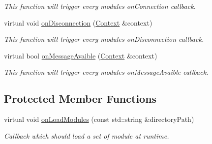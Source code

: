 \begin{DoxyCompactItemize}
\begin{DoxyCompactList}\small\item\em This function will trigger every module\textquotesingle{}s \textquotesingle{}on\+Connection\textquotesingle{} callback. \end{DoxyCompactList}\item 
virtual void \mbox{\hyperlink{classo_z_1_1_pipeline_a4245ad0f1fb310cf19986dbaf0bff3d2}{on\+Disconnection}} (\mbox{\hyperlink{classo_z_1_1_context}{Context}} \&context)
\begin{DoxyCompactList}\small\item\em This function will trigger every module\textquotesingle{}s \textquotesingle{}on\+Disconnection\textquotesingle{} callback. \end{DoxyCompactList}\item 
virtual bool \mbox{\hyperlink{classo_z_1_1_pipeline_a5dc5181a699312bc35384ad706668e3c}{on\+Message\+Avaible}} (\mbox{\hyperlink{classo_z_1_1_context}{Context}} \&context)
\begin{DoxyCompactList}\small\item\em This function will trigger every module\textquotesingle{}s \textquotesingle{}on\+Message\+Avaible\textquotesingle{} callback. \end{DoxyCompactList}\end{DoxyCompactItemize}
\subsection*{Protected Member Functions}
\begin{DoxyCompactItemize}
\item 
virtual void \mbox{\hyperlink{classo_z_1_1_pipeline_a0265d90a5540e69b25069d5d96973c53}{on\+Load\+Modules}} (const std\+::string \&directory\+Path)
\begin{DoxyCompactList}\small\item\em Callback which should load a set of module at runtime. \end{DoxyCompactList}\end{DoxyCompactItemize}
